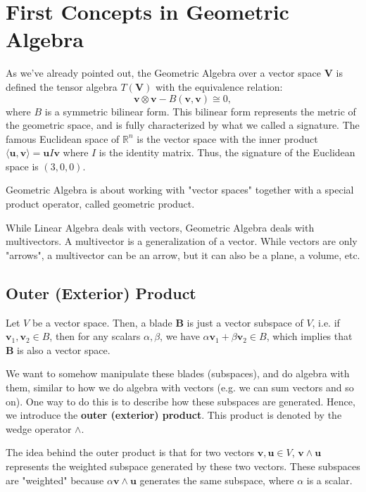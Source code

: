 \section{First Concepts in Geometric Algebra}

As we've already pointed out, the Geometric Algebra
over a vector space $\mathbf V$ is defined the tensor
algebra $T(\mathbf V)$ with the equivalence relation:
\begin{displaymath}
	\mathbf{v} \otimes \mathbf{v} - B(\mathbf v, \mathbf v) \cong 0,
\end{displaymath}
where $B$ is a symmetric bilinear form.
This bilinear form represents the metric of the geometric space,
and is fully characterized by what we called a signature.
The famous Euclidean space of $\mathbb R^n$ is the vector
space with the inner product
$\langle \mathbf u, \mathbf v \rangle = \mathbf u I \mathbf v$
where $I$ is the identity matrix.
Thus, the signature of the Euclidean space is $(3,0,0)$.

Geometric Algebra is about working with "vector spaces" together with a special
product operator, called geometric product.

While Linear Algebra deals with vectors, Geometric Algebra deals with multivectors.
A multivector is a generalization of a vector. While vectors are only "arrows", a multivector
can be an arrow, but it can also be a plane, a volume, etc.

\subsection{Outer (Exterior) Product}

Let $V$ be a vector space. Then, a blade $\mathbf B$ is just a vector subspace of $V$, i.e. 
if $\mathbf v_1, \mathbf v_2 \in B$, then for any scalars $\alpha, \beta$,
we have $\alpha \mathbf v_1 + \beta \mathbf v_2 \in B$, which implies that
$\mathbf B$ is also a vector space.

We want to somehow manipulate these blades (subspaces), and do algebra with them,
similar to how we do algebra with vectors (e.g. we can sum vectors
and so on). One way to do this is to describe how these subspaces are generated.
Hence, we introduce the \textbf{outer (exterior) product}.
This product is denoted by the wedge operator $\wedge$.

The idea behind the outer product is that for two vectors $\mathbf v, \mathbf u \in V$, $\mathbf v \wedge \mathbf u$ represents the weighted subspace generated
by these two vectors. These subspaces are "weighted" because $\alpha \mathbf v \wedge \mathbf u$ generates the same subspace, where
$\alpha$ is a scalar.

